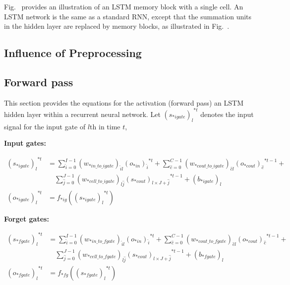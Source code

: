 \documentclass[runningheads,openany]{xhlPaper}
\begin{document}
Fig.~ provides an illustration of an LSTM memory block with a single cell. An LSTM network is the same as a standard RNN, except that the summation units in the hidden layer are replaced by memory blocks, as illustrated in Fig.~.

\subsection{Influence of Preprocessing}


\subsection{Forward pass}
This section provides the equations for the activation (forward pass) an LSTM hidden layer within a recurrent neural network.
Let ${\left(s_{*igate}\right)_{l}}^{*t}$ denotes the input signal for the input gate of $l$th in time $t$, 


\textbf{Input gates:}

\begin{equation}
\label{equ:rnn_lstm_forward_input_gate}
\begin{aligned}
{\left( {{s_{*igate}}} \right)_l}^{*t} &= \sum\limits_{\hat i = 0}^{I - 1} {{{\left( {{w_{*in\_to\_igate}}} \right)}_{\hat il}}{{\left( {{o_{*in}}} \right)}_{\hat i}}^{*t}}  + \sum\limits_{\hat c = 0}^{C - 1} {{{\left( {{w_{*cout\_to\_igate}}} \right)}_{\hat cl}}{{\left( {{o_{*cout}}} \right)}_{\hat c}}^{*t - 1}}  + \\
&\quad\sum\limits_{\hat j = 0}^{J - 1} {{{\left( {{w_{*cell\_to\_igate}}} \right)}_{l\hat j}}{{\left( {{s_{*cout}}} \right)}_{l \times J + \hat j}}^{*t - 1}}  + {\left( {{b_{*igate}}} \right)_l}\\
{\left( {{o_{*igate}}} \right)_l}^{*t} &= {f_{*ig}}\left( {{{\left( {{s_{*igate}}} \right)}_l}^{*t}} \right)
\end{aligned}
\end{equation}

\textbf{Forget gates:}

\begin{equation}
\label{equ:rnn_lstm_forward_forget_gate}
\begin{aligned}
{\left( {{s_{*fgate}}} \right)_l}^{*t} &= \sum\limits_{\hat i = 0}^{I - 1} {{{\left( {{w_{*in\_to\_fgate}}} \right)}_{\hat il}}{{\left( {{o_{*in}}} \right)}_{\hat i}}^{*t}}  + \sum\limits_{\hat c = 0}^{C - 1} {{{\left( {{w_{*cout\_to\_fgate}}} \right)}_{\hat cl}}{{\left( {{o_{*cout}}} \right)}_{\hat c}}^{*t - 1}}  + \\
&\quad\sum\limits_{\hat j = 0}^{J - 1} {{{\left( {{w_{*cell\_to\_fgate}}} \right)}_{l\hat j}}{{\left( {{s_{*cout}}} \right)}_{l \times J + \hat j}}^{*t - 1}}  + {\left( {{b_{*fgate}}} \right)_l}\\
{\left( {{o_{*fgate}}} \right)_l}^{*t} &= {f_{*fg}}\left( {{{\left( {{s_{*fgate}}} \right)}_l}^{*t}} \right)
\end{aligned}
\end{equation}
\end{document}
